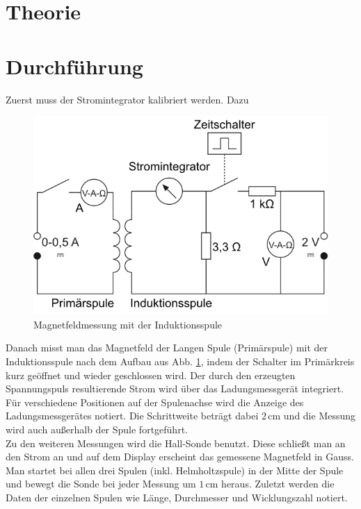 \documentclass[12pt,a4paper,titlepage,headinclude,bibtotoc]{scrartcl}
\begin{document}
\section{Theorie}
\label{sec:theorie}



\section{Durchführung}
\label{sec:durchfuehrung}
Zuerst muss der Stromintegrator kalibriert werden.
Dazu \\
\begin{figure}[!htb]
	 \centering
	 \includegraphics[scale=1.0]{IndSpuleAufbau.png}
	\caption{Magnetfeldmessung mit der Induktionsspule \cite[Datum: 09.10.2014]{LP13}}	 
	 \label{fig:IndSpule}
\end{figure}
Danach misst man das Magnetfeld der Langen Spule (Primärspule) mit der Induktionsspule nach dem Aufbau aus Abb. \ref{fig:IndSpule}, indem der Schalter im Primärkreis kurz geöffnet und wieder geschlossen wird.
Der durch den erzeugten Spannungspuls resultierende Strom wird über das Ladungsmessgerät integriert.
Für verschiedene Positionen auf der Spulenachse wird die Anzeige des Ladungsmessgerätes notiert.
Die Schrittweite beträgt dabei $2\,$cm und die Messung wird auch außerhalb der Spule fortgeführt.\\
Zu den weiteren Messungen wird die Hall-Sonde benutzt.
Diese schließt man an den Strom an und auf dem Display erscheint das gemessene Magnetfeld in Gauss.
Man startet bei allen drei Spulen (inkl. Helmholtzspule) in der Mitte der Spule und bewegt die Sonde bei jeder Messung um $1\,$cm heraus.
Zuletzt werden die Daten der einzelnen Spulen wie Länge, Durchmesser und Wicklungszahl notiert.
\end{document}
